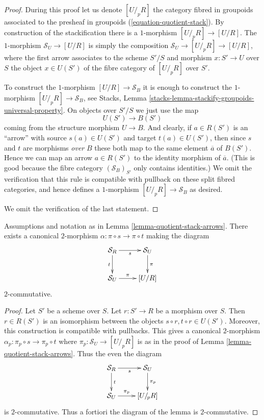 \begin{proof}
During this proof let us denote $[U/_{\!p}R]$ the category fibred in
groupoids associated to the presheaf in groupoids
(\ref{equation-quotient-stack}). By construction of the stackification
there is a $1$-morphism $[U/_{\!p}R] \to [U/R]$.
The $1$-morphism $\mathcal{S}_U \to [U/R]$ is simply the composition
$\mathcal{S}_U \to [U/_{\!p}R] \to [U/R]$, where the first arrow
associates to the scheme $S'/S$ and morphism $x : S' \to U$ over $S$
the object $x \in U(S')$ of the fibre category of $[U/_{\!p}R]$
over $S'$.

\medskip\noindent
To construct the $1$-morphism $[U/R] \to \mathcal{S}_B$ it is enough to
construct the $1$-morphism $[U/_{\!p}R] \to \mathcal{S}_B$, see
Stacks, Lemma \ref{stacks-lemma-stackify-groupoids-universal-property}.
On objects over $S'/S$ we just use the map
$$
U(S') \longrightarrow B(S')
$$
coming from the structure morphism $U \to B$.
And clearly, if $a \in R(S')$ is an ``arrow'' with source
$s(a) \in U(S')$ and target $t(a) \in U(S')$, then since
$s$ and $t$ are morphisms {\it over} $B$ these both
map to the same element $\overline{a}$ of $B(S')$. Hence we can map an arrow
$a \in R(S')$ to the identity morphism of $\overline{a}$. (This is
good because the fibre category $(\mathcal{S}_B)_{S'}$ only contains
identities.) We omit the verification that this rule is compatible with
pullback on these split fibred categories, and hence defines a
$1$-morphism $[U/_{\!p}R] \to \mathcal{S}_B$ as desired.

\medskip\noindent
We omit the verification of the last statement.
\end{proof}

\begin{lemma}
\label{lemma-quotient-stack-2-arrow}
Assumptions and notation as in Lemma \ref{lemma-quotient-stack-arrows}.
There exists a canonical $2$-morphism
$\alpha : \pi \circ s \to \pi \circ t$ making the diagram
$$
\xymatrix{
\mathcal{S}_R \ar[r]_s \ar[d]_t & \mathcal{S}_U \ar[d]^\pi \\
\mathcal{S}_U \ar[r]^-\pi & [U/R]
}
$$
$2$-commutative.
\end{lemma}

\begin{proof}
Let $S'$ be a scheme over $S$. Let $r : S' \to R$ be a morphism over $S$.
Then $r \in R(S')$ is an isomorphism between the objects
$s \circ r, t \circ r \in U(S')$. Moreover, this construction is
compatible with pullbacks. This gives a canonical
$2$-morphism $\alpha_p : \pi_p \circ s \to \pi_p \circ t$
where $\pi_p : \mathcal{S}_U \to [U/_{\!p}R]$ is as in the
proof of
Lemma \ref{lemma-quotient-stack-arrows}. Thus the even the diagram
$$
\xymatrix{
\mathcal{S}_R \ar[r]_s \ar[d]^t & \mathcal{S}_U \ar[d]^{\pi_p} \\
\mathcal{S}_U \ar[r]^-{\pi_p} & [U/_{\!p}R]
}
$$
is $2$-commutative. Thus a fortiori the diagram
of the lemma is $2$-commutative.
\end{proof}

